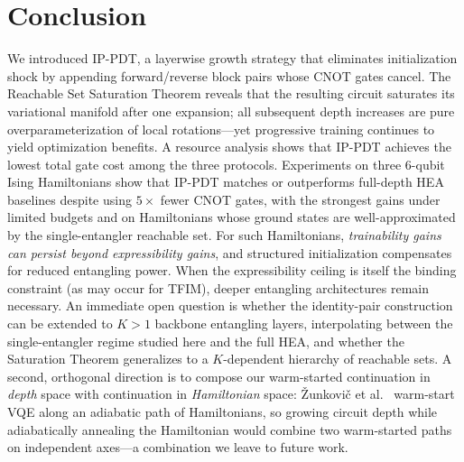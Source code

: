 \documentclass[11pt]{article}
\theoremstyle{plain}
\theoremstyle{plain}
\begin{document}
\section{Conclusion}\label{sec:conclusion}
We introduced IP-PDT, a layerwise growth strategy that eliminates
initialization shock by appending forward/reverse block pairs whose CNOT
gates cancel.  The Reachable Set Saturation Theorem reveals that the
resulting circuit saturates its variational manifold after one expansion;
all subsequent depth increases are pure overparameterization of local
rotations---yet progressive training continues to yield optimization
benefits.  A resource analysis shows that IP-PDT achieves the lowest
total gate cost among the three protocols.  Experiments on three 6-qubit
Ising Hamiltonians show that IP-PDT matches or outperforms full-depth
HEA baselines despite using $5\times$ fewer CNOT gates, with the
strongest gains under limited budgets and on Hamiltonians whose ground
states are well-approximated by the single-entangler reachable set.
For such Hamiltonians, \emph{trainability gains can persist beyond
expressibility gains}, and structured initialization compensates for
reduced entangling power.  When the expressibility ceiling is itself
the binding constraint (as may occur for TFIM), deeper entangling
architectures remain necessary.
An immediate open question is whether the identity-pair construction
can be extended to $K>1$ backbone entangling layers, interpolating
between the single-entangler regime studied here and the full HEA,
and whether the Saturation Theorem generalizes to a $K$-dependent
hierarchy of reachable sets.
A second, orthogonal direction is to compose our warm-started
continuation in \emph{depth} space with continuation in \emph{Hamiltonian}
space: \v{Z}unkovi\v{c} et al.~\cite{zunkovic2026adiabatic} warm-start VQE
along an adiabatic path of Hamiltonians, so growing circuit depth while
adiabatically annealing the Hamiltonian would combine two warm-started
paths on independent axes---a combination we leave to future work.
\end{document}
